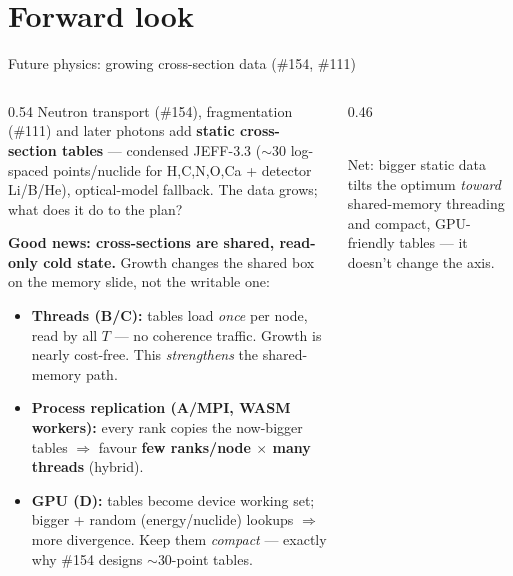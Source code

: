 \documentclass[aspectratio=169,10pt]{beamer}
\begin{document}
\section{Forward look}
\begin{frame}{Future physics: growing cross-section data (\#154, \#111)}
  \begin{columns}[T]
    \begin{column}{0.54\textwidth}
      \small
      Neutron transport (\#154), fragmentation (\#111) and later photons add
      \textbf{static cross-section tables} — condensed JEFF-3.3
      ($\sim$30 log-spaced points/nuclide for H,C,N,O,Ca + detector
      Li/B/He), optical-model fallback. The data grows; what does it do to the
      plan?
      \medskip

      \textbf{Good news: cross-sections are \textcolor{oshGreen}{shared,
      read-only} cold state.} Growth changes the shared box on the memory
      slide, not the writable one:
      \begin{itemize}\scriptsize\itemsep1pt
        \item \textbf{Threads (B/C):} tables load \emph{once} per node, read by
              all $T$ — no coherence traffic. Growth is nearly cost-free. This
              \emph{strengthens} the shared-memory path.
        \item \textbf{Process replication (A/MPI, WASM workers):} every rank
              copies the now-bigger tables $\Rightarrow$ favour
              \textbf{few ranks/node $\times$ many threads} (hybrid).
        \item \textbf{GPU (D):} tables become device working set; bigger +
              random (energy/nuclide) lookups $\Rightarrow$ more divergence.
              Keep them \emph{compact} — exactly why \#154 designs $\sim$30-point
              tables.
      \end{itemize}
    \end{column}
    \begin{column}{0.46\textwidth}
      \centering
      \\[1mm]
      \footnotesize\color{oshGreen}
      Net: bigger static data tilts the optimum \emph{toward} shared-memory
      threading and compact, GPU-friendly tables — it doesn't change the axis.
    \end{column}
  \end{columns}
\end{frame}
\end{document}
